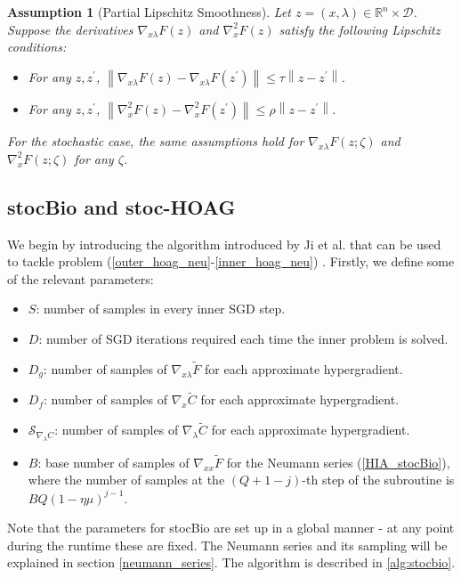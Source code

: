 \documentclass[11pt, twoside]{report}
\newtheorem{assumption}[theorem]{Assumption}
\begin{document}

\begin{assumption}[Partial Lipschitz Smoothness] \label{pls_ass}
Let $z = (x,\lambda) \in \mathbb{R}^{n} \times \mathcal{D}$. Suppose the derivatives $\nabla_{x\lambda} F(z)$ and $\nabla_x^2 F(z)$ satisfy the following Lipschitz conditions:
\begin{itemize}
    \item For any $z, z^{\prime}$, $\left\|\nabla_{x\lambda} F(z)-\nabla_{x\lambda} F(z^{\prime})\right\| \leq \tau\left\|z-z^{\prime}\right\|$.
    \item For any $z, z^{\prime}$, $\left\|\nabla_x^2 F(z)-\nabla_x^2 F\left(z^{\prime}\right)\right\| \leq \rho\left\|z-z^{\prime}\right\|$.
\end{itemize}
For the stochastic case, the same assumptions hold for $\nabla_{x\lambda} F(z; \zeta)$ and $\nabla_x^2 F(z ; \zeta)$ for any $\zeta$.
\end{assumption}

\subsection{stocBio and stoc-HOAG}
We begin by introducing the algorithm introduced by Ji et al. that can be used to tackle problem (\ref{outer_hoag_neu}-\ref{inner_hoag_neu}) \cite{ji2021bilevel}. Firstly, we define some of the relevant parameters:
\begin{itemize}
    \item $S$: number of samples in every inner SGD step.
    \item $D$: number of SGD iterations required each time the inner problem is solved.
    \item $D_g$: number of samples of $\nabla_{x\lambda} \tilde{F}$ for each approximate hypergradient.
    \item $D_f$: number of samples of $\nabla_x \tilde{C}$ for each approximate hypergradient.
    \item $\mathcal{S}_{\nabla_\lambda C}$: number of samples of $\nabla_{\lambda} \tilde{C}$ for each approximate hypergradient.
    \item $B$: base number of samples of $\nabla_{xx} \tilde{F}$ for the Neumann series (\ref{HIA_stocBio}), where the number of samples at the $(Q+1-j)$-th step of the subroutine is $BQ(1-\eta\mu)^{j-1}$.
\end{itemize}
Note that the parameters for stocBio are set up in a global manner - at any point during the runtime these are fixed. The Neumann series and its sampling will be explained in section \ref{neumann_series}. The algorithm is described in \ref{alg:stocbio}.
\end{document}
